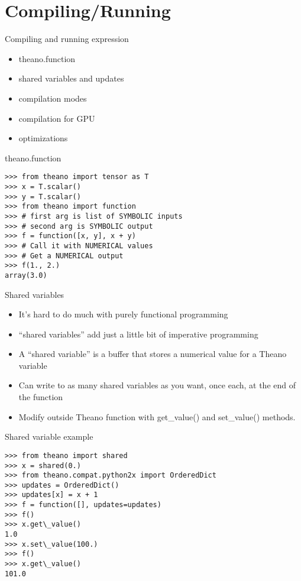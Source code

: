 \documentclass[utf8x]{beamer}
\begin{document}
\section{Compiling/Running}
\begin{frame}{Compiling and running expression}
  \begin{itemize}
  \item theano.function
  \item shared variables and updates
  \item compilation modes
  \item compilation for GPU
  \item optimizations
  \end{itemize}
\end{frame}

\begin{frame}[fragile]{theano.function}

\begin{lstlisting}
>>> from theano import tensor as T
>>> x = T.scalar()
>>> y = T.scalar()
>>> from theano import function
>>> # first arg is list of SYMBOLIC inputs
>>> # second arg is SYMBOLIC output
>>> f = function([x, y], x + y)
>>> # Call it with NUMERICAL values
>>> # Get a NUMERICAL output
>>> f(1., 2.)
array(3.0)
\end{lstlisting}
\end{frame}

\begin{frame}{Shared variables}
  \begin{itemize}
  \item It’s hard to do much with purely functional programming
  \item ``shared variables'' add just a little bit of imperative programming
  \item A “shared variable” is a buffer that stores a numerical value for a Theano variable
  \item Can write to as many shared variables as you want, once each, at the end of the function
  \item  Modify outside Theano function with get\_value() and set\_value() methods.
  \end{itemize}
\end{frame}

\begin{frame}[fragile]{Shared variable example}

\begin{lstlisting}
>>> from theano import shared
>>> x = shared(0.)
>>> from theano.compat.python2x import OrderedDict
>>> updates = OrderedDict()
>>> updates[x] = x + 1
>>> f = function([], updates=updates)
>>> f()
>>> x.get\_value()
1.0
>>> x.set\_value(100.)
>>> f()
>>> x.get\_value()
101.0
\end{lstlisting}
\end{frame}
\end{document}
